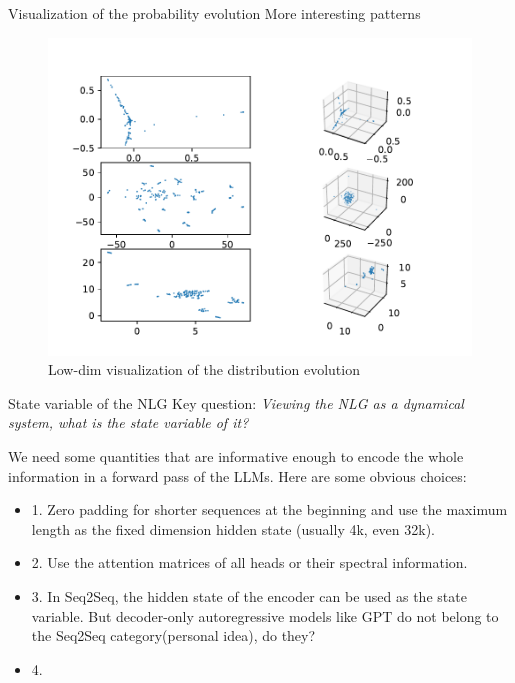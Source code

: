 \documentclass{beamer}
\begin{document}
\begin{frame}{Visualization of the probability evolution}
	More interesting patterns
	\begin{figure}[ht]
		\centering
		\includegraphics[width=\textwidth]{fig/prob_evolve_2.pdf}
		\caption{Low-dim visualization of the distribution evolution}
	\end{figure}
\end{frame}

\begin{frame}{State variable of the NLG}
	Key question: \textit{Viewing the NLG as a dynamical system, what is the state variable of it?}

	We need some quantities that are informative enough to encode the whole information in a forward pass 
	of the LLMs. Here are some obvious choices:
	\begin{itemize}
		\item 1. Zero padding for shorter sequences at the beginning and use the maximum length as the fixed
		dimension hidden state (usually 4k, even 32k). 
		\item 2. Use the attention matrices of all heads or their spectral information.
		\item 3. In Seq2Seq, the hidden state of the encoder can be used as the state variable. But decoder-only 
		autoregressive models like GPT do not belong to the Seq2Seq category(personal idea), do they?
		\item 4. 
	\end{itemize}
\end{frame}
\end{document}
